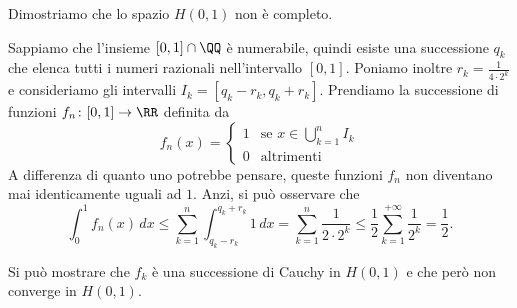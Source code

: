 \begin{example}
\label{ex:incompletezza_di_H}%
Dimostriamo che lo spazio $H(0,1)$ non è completo.

Sappiamo che l'insieme $[0,1]\cap \QQ$ è numerabile, quindi esiste una
successione $q_k$ che elenca tutti i numeri razionali nell'intervallo $[0,1]$.
Poniamo inoltre $r_k = \frac{1}{4\cdot 2^k}$ e consideriamo gli intervalli
$I_k = [q_k-r_k,q_k+r_k]$.
Prendiamo la successione di funzioni $f_n\colon [0,1]\to \RR$
definita da
\[
  f_n(x) =
  \begin{cases}
  1 &\text{se } x\in\displaystyle\bigcup_{k=1}^{n} I_k\\
  0 & \text{altrimenti}
  \end{cases}
\]
A differenza di quanto uno potrebbe pensare, queste funzioni $f_n$ non diventano
mai identicamente uguali ad $1$. Anzi, si può osservare che
\[
  \int_0^1 f_n(x)\, dx
  \le \sum_{k=1}^n \int_{q_k-r_k}^{q_k+r_k} 1\, dx
  = \sum_{k=1}^n \frac{1}{2\cdot 2^k}
  \le \frac{1}{2}\sum_{k=1}^{+\infty}\frac{1}{2^k} = \frac 1 2.
\]

Si può mostrare che $f_k$ è una successione di Cauchy in $H(0,1)$ e
che però non converge in $H(0,1)$.
\end{example}


